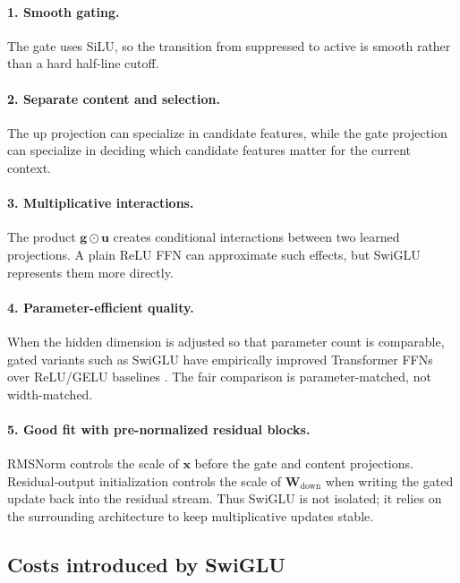 \documentclass[11pt,a4paper]{article}
\theoremstyle{definition}
\theoremstyle{plain}
\newcommand{\vx}{\bm{x}}
\newcommand{\vu}{\bm{u}}
\newcommand{\vg}{\bm{g}}
\newcommand{\mW}{\bm{W}}
\begin{document}
\paragraph{1. Smooth gating.}
The gate uses SiLU, so the transition from suppressed to active is smooth rather than a hard half-line cutoff.

\paragraph{2. Separate content and selection.}
The up projection can specialize in candidate features, while the gate projection can specialize in deciding which candidate features matter for the current context.

\paragraph{3. Multiplicative interactions.}
The product $\vg\odot\vu$ creates conditional interactions between two learned projections. A plain ReLU FFN can approximate such effects, but SwiGLU represents them more directly.

\paragraph{4. Parameter-efficient quality.}
When the hidden dimension is adjusted so that parameter count is comparable, gated variants such as SwiGLU have empirically improved Transformer FFNs over ReLU/GELU baselines \cite{shazeer2020glu}. The fair comparison is parameter-matched, not width-matched.

\paragraph{5. Good fit with pre-normalized residual blocks.}
RMSNorm controls the scale of $\vx$ before the gate and content projections. Residual-output initialization controls the scale of $\mW_{\mathrm{down}}$ when writing the gated update back into the residual stream. Thus SwiGLU is not isolated; it relies on the surrounding architecture to keep multiplicative updates stable.

\subsection{Costs introduced by SwiGLU}
\end{document}
